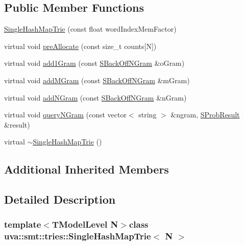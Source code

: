 \subsection*{Public Member Functions}
\begin{DoxyCompactItemize}
\item 
\hyperlink{classuva_1_1smt_1_1tries_1_1_single_hash_map_trie_aeb7a9f63ac580aa6004c6e041cfae4a7}{Single\+Hash\+Map\+Trie} (const float word\+Index\+Mem\+Factor)
\item 
virtual void \hyperlink{classuva_1_1smt_1_1tries_1_1_single_hash_map_trie_a6a40f4047280dedc7f402d6502547b2c}{pre\+Allocate} (const size\+\_\+t counts\mbox{[}N\mbox{]})
\item 
virtual void \hyperlink{classuva_1_1smt_1_1tries_1_1_single_hash_map_trie_a27f420ad02db97ab648ef27ffb12e688}{add1\+Gram} (const \hyperlink{structuva_1_1smt_1_1tries_1_1_s_back_off_n_gram}{S\+Back\+Off\+N\+Gram} \&o\+Gram)
\item 
virtual void \hyperlink{classuva_1_1smt_1_1tries_1_1_single_hash_map_trie_a2da8d1cba4cdbab7cc79bcfc4f55117b}{add\+M\+Gram} (const \hyperlink{structuva_1_1smt_1_1tries_1_1_s_back_off_n_gram}{S\+Back\+Off\+N\+Gram} \&m\+Gram)
\item 
virtual void \hyperlink{classuva_1_1smt_1_1tries_1_1_single_hash_map_trie_af9541116f44c985e80f9d1173512fc4f}{add\+N\+Gram} (const \hyperlink{structuva_1_1smt_1_1tries_1_1_s_back_off_n_gram}{S\+Back\+Off\+N\+Gram} \&n\+Gram)
\item 
virtual void \hyperlink{classuva_1_1smt_1_1tries_1_1_single_hash_map_trie_ac0a2b8c57ccfd60a8b06ea2116cf8349}{query\+N\+Gram} (const vector$<$ string $>$ \&ngram, \hyperlink{structuva_1_1smt_1_1tries_1_1_s_prob_result}{S\+Prob\+Result} \&result)
\item 
virtual \hyperlink{classuva_1_1smt_1_1tries_1_1_single_hash_map_trie_aac6973244c2fc6cdfac3d2200c4b9dcf}{$\sim$\+Single\+Hash\+Map\+Trie} ()
\end{DoxyCompactItemize}
\subsection*{Additional Inherited Members}


\subsection{Detailed Description}
\subsubsection*{template$<$T\+Model\+Level N$>$class uva\+::smt\+::tries\+::\+Single\+Hash\+Map\+Trie$<$ N $>$}


